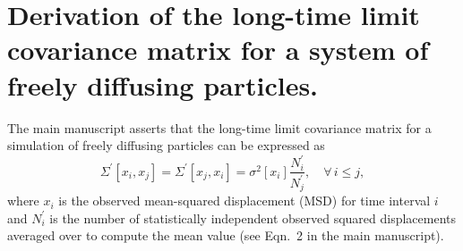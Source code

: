 \documentclass[reprint,superscriptaddress,nobibnotes,amsmath,amssymb,aps,prx,hidelinks]{revtex4-2}
\newcommand{\oMSDi}{\ensuremath{x_i}}
\newcommand{\oMSDj}{\ensuremath{x_j}}
\newcommand{\nind}[1]{\ensuremath{N^\prime_{#1}}}
\newcommand{\var}[1]{\ensuremath{\sigma^2[#1]}}
\begin{document}

\section{Derivation of the long-time limit covariance matrix for a system of freely diffusing particles.}
\label{sec:ran}
%
The main manuscript asserts that the long-time limit covariance matrix for a simulation of freely diffusing particles can be expressed as
%
\begin{equation}
  \Sigma^\prime\left[\oMSDi, \oMSDj\right]= \Sigma^\prime\left[\oMSDj, \oMSDi\right] =
  \var{\oMSDi} \frac{\nind{i}}{\nind{j}},\hspace{1em} \forall\,i \leq j,
  \label{equ:cvv_SI}
\end{equation}
%
where $\oMSDi$ is the observed mean-squared displacement (MSD) for time interval $i$ and $\nind{i}$ is the number of statistically independent observed squared displacements averaged over to compute the mean value (see Eqn.~2 in the main manuscript).
\end{document}
